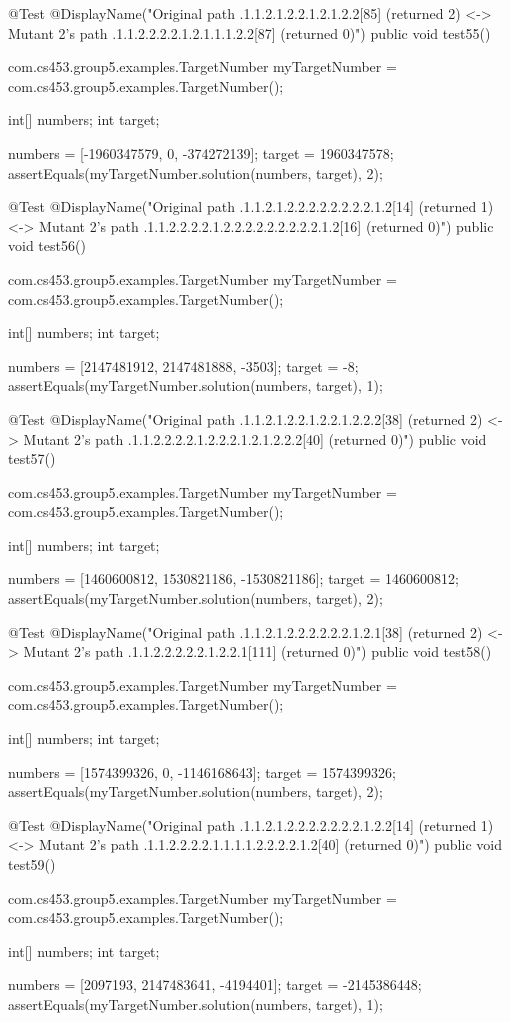 @Test
@DisplayName("Original path .1.1.2.1.2.2.1.2.1.2.2[85] (returned 2) <-> Mutant 2's path .1.1.2.2.2.2.1.2.1.1.1.2.2[87] (returned 0)")
public void test55() {
    com.cs453.group5.examples.TargetNumber myTargetNumber = com.cs453.group5.examples.TargetNumber();

    int[] numbers;
    int target;

    numbers = [-1960347579, 0, -374272139];
    target = 1960347578;
    assertEquals(myTargetNumber.solution(numbers, target), 2);
}

@Test
@DisplayName("Original path .1.1.2.1.2.2.2.2.2.2.2.2.1.2[14] (returned 1) <-> Mutant 2's path .1.1.2.2.2.2.1.2.2.2.2.2.2.2.2.2.1.2[16] (returned 0)")
public void test56() {
    com.cs453.group5.examples.TargetNumber myTargetNumber = com.cs453.group5.examples.TargetNumber();

    int[] numbers;
    int target;

    numbers = [2147481912, 2147481888, -3503];
    target = -8;
    assertEquals(myTargetNumber.solution(numbers, target), 1);
}

@Test
@DisplayName("Original path .1.1.2.1.2.2.1.2.2.1.2.2.2[38] (returned 2) <-> Mutant 2's path .1.1.2.2.2.2.1.2.2.2.1.2.1.2.2.2[40] (returned 0)")
public void test57() {
    com.cs453.group5.examples.TargetNumber myTargetNumber = com.cs453.group5.examples.TargetNumber();

    int[] numbers;
    int target;

    numbers = [1460600812, 1530821186, -1530821186];
    target = 1460600812;
    assertEquals(myTargetNumber.solution(numbers, target), 2);
}

@Test
@DisplayName("Original path .1.1.2.1.2.2.2.2.2.2.1.2.1[38] (returned 2) <-> Mutant 2's path .1.1.2.2.2.2.2.1.2.2.1[111] (returned 0)")
public void test58() {
    com.cs453.group5.examples.TargetNumber myTargetNumber = com.cs453.group5.examples.TargetNumber();

    int[] numbers;
    int target;

    numbers = [1574399326, 0, -1146168643];
    target = 1574399326;
    assertEquals(myTargetNumber.solution(numbers, target), 2);
}

@Test
@DisplayName("Original path .1.1.2.1.2.2.2.2.2.2.2.1.2.2[14] (returned 1) <-> Mutant 2's path .1.1.2.2.2.2.1.1.1.1.2.2.2.2.1.2[40] (returned 0)")
public void test59() {
    com.cs453.group5.examples.TargetNumber myTargetNumber = com.cs453.group5.examples.TargetNumber();

    int[] numbers;
    int target;

    numbers = [2097193, 2147483641, -4194401];
    target = -2145386448;
    assertEquals(myTargetNumber.solution(numbers, target), 1);
}

